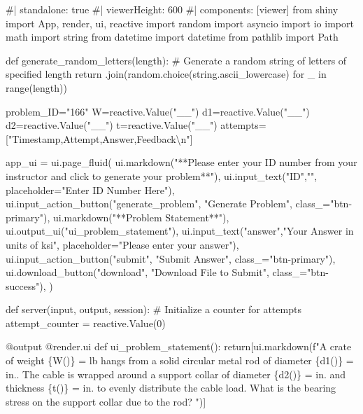 \documentclass[
  letterpaper,
  DIV=11,
  numbers=noendperiod]{scrreprt}
\newenvironment{Shaded}{\begin{snugshade}}{\end{snugshade}}
\newcommand{\NormalTok}[1]{\textcolor[rgb]{0.00,0.23,0.31}{#1}}
\begin{document}
\begin{Shaded}
\begin{Highlighting}[]
\NormalTok{\#| standalone: true}
\NormalTok{\#| viewerHeight: 600}
\NormalTok{\#| components: [viewer]}
\NormalTok{from shiny import App, render, ui, reactive}
\NormalTok{import random}
\NormalTok{import asyncio}
\NormalTok{import io}
\NormalTok{import math}
\NormalTok{import string}
\NormalTok{from datetime import datetime}
\NormalTok{from pathlib import Path}

\NormalTok{def generate\_random\_letters(length):}
\NormalTok{    \# Generate a random string of letters of specified length}
\NormalTok{    return \textquotesingle{}\textquotesingle{}.join(random.choice(string.ascii\_lowercase) for \_ in range(length))}

\NormalTok{problem\_ID="166"}
\NormalTok{W=reactive.Value("\_\_")}
\NormalTok{d1=reactive.Value("\_\_")}
\NormalTok{d2=reactive.Value("\_\_")}
\NormalTok{t=reactive.Value("\_\_")}
\NormalTok{attempts=["Timestamp,Attempt,Answer,Feedback\textbackslash{}n"]}

\NormalTok{app\_ui = ui.page\_fluid(}
\NormalTok{    ui.markdown("**Please enter your ID number from your instructor and click to generate your problem**"),}
\NormalTok{    ui.input\_text("ID","", placeholder="Enter ID Number Here"),}
\NormalTok{    ui.input\_action\_button("generate\_problem", "Generate Problem", class\_="btn{-}primary"),}
\NormalTok{    ui.markdown("**Problem Statement**"),}
\NormalTok{    ui.output\_ui("ui\_problem\_statement"),}
\NormalTok{    ui.input\_text("answer","Your Answer in units of ksi", placeholder="Please enter your answer"),}
\NormalTok{    ui.input\_action\_button("submit", "Submit Answer", class\_="btn{-}primary"),}
\NormalTok{    ui.download\_button("download", "Download File to Submit", class\_="btn{-}success"),}
\NormalTok{)}


\NormalTok{def server(input, output, session):}
\NormalTok{    \# Initialize a counter for attempts}
\NormalTok{    attempt\_counter = reactive.Value(0)}
    
\NormalTok{    @output}
\NormalTok{    @render.ui}
\NormalTok{    def ui\_problem\_statement():}
\NormalTok{        return[ui.markdown(f"A crate of weight \{W()\} = lb hangs from a solid circular metal rod of diameter \{d1()\} = in.. The cable is wrapped around a support collar of diameter \{d2()\} = in. and thickness \{t()\} = in. to evenly distribute the cable load. What is the bearing stress on the support collar due to the rod? ")]}
    

\end{Highlighting}
\end{Shaded}
\end{document}
